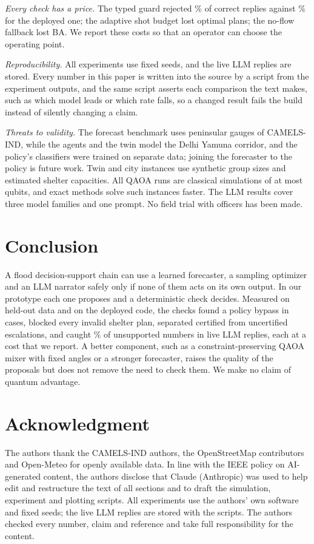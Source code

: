 \documentclass[conference]{IEEEtran}
\begin{document}
\textit{Every check has a price.} The typed guard rejected \AgLiveTypFpr\% of correct replies against \AgLiveDepFpr\% for the deployed one; the adaptive shot budget lost optimal plans; the no-flow fallback lost BA. We report these costs so that an operator can choose the operating point.

\textit{Reproducibility.} All experiments use fixed seeds, and the live LLM replies are stored. Every number in this paper is written into the source by a script from the experiment outputs, and the same script asserts each comparison the text makes, such as which model leads or which rate falls, so a changed result fails the build instead of silently changing a claim.

\textit{Threats to validity.} The forecast benchmark uses peninsular gauges of CAMELS-IND, while the agents and the twin model the Delhi Yamuna corridor, and the policy's classifiers were trained on separate data; joining the forecaster to the policy is future work. Twin and city instances use synthetic group sizes and estimated shelter capacities. All QAOA runs are classical simulations of at most \QaScaleMaxQ{} qubits, and exact methods solve such instances faster. The LLM results cover three model families and one prompt. No field trial with officers has been made.

\section{Conclusion}
A flood decision-support chain can use a learned forecaster, a sampling optimizer and an LLM narrator safely only if none of them acts on its own output. In our prototype each one proposes and a deterministic check decides. Measured on held-out data and on the deployed code, the checks found a policy bypass in \AgEtoEViolBefore{} cases, blocked every invalid shelter plan, separated certified from uncertified escalations, and caught \AgLiveTypRec\% of unsupported numbers in live LLM replies, each at a cost that we report. A better component, such as a constraint-preserving QAOA mixer with fixed angles or a stronger forecaster, raises the quality of the proposals but does not remove the need to check them. We make no claim of quantum advantage.

\section*{Acknowledgment}
The authors thank the CAMELS-IND authors, the OpenStreetMap contributors and Open-Meteo for openly available data.
In line with the IEEE policy on AI-generated content, the authors disclose that Claude (Anthropic) was used to help edit and restructure the text of all sections and to draft the simulation, experiment and plotting scripts. All experiments use the authors' own software and fixed seeds; the live LLM replies are stored with the scripts. The authors checked every number, claim and reference and take full responsibility for the content.
\end{document}
